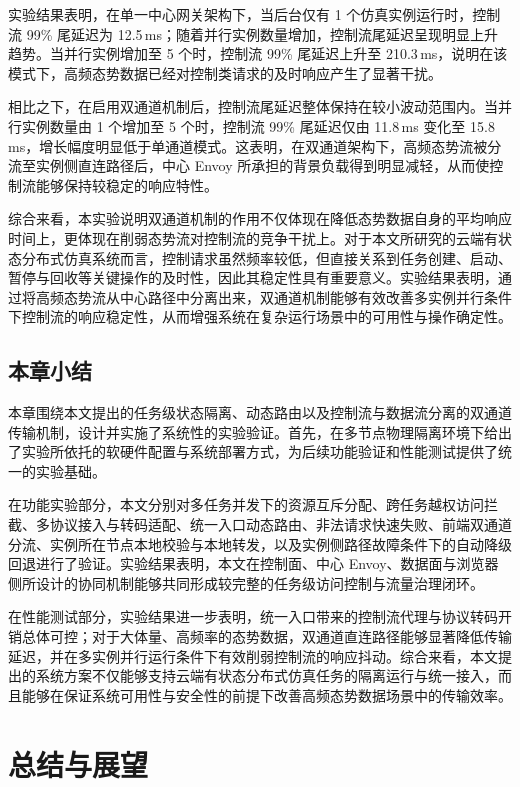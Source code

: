 \documentclass[lang=chs, degree=master, blindreview=true, winfonts=true, academic=false]{yanputhesis}
\begin{document}
实验结果表明，在单一中心网关架构下，当后台仅有 1 个仿真实例运行时，控制流 99\% 尾延迟为 12.5\,ms；随着并行实例数量增加，控制流尾延迟呈现明显上升趋势。当并行实例增加至 5 个时，控制流 99\% 尾延迟上升至 210.3\,ms，说明在该模式下，高频态势数据已经对控制类请求的及时响应产生了显著干扰。

相比之下，在启用双通道机制后，控制流尾延迟整体保持在较小波动范围内。当并行实例数量由 1 个增加至 5 个时，控制流 99\% 尾延迟仅由 11.8\,ms 变化至 15.8\,ms，增长幅度明显低于单通道模式。这表明，在双通道架构下，高频态势流被分流至实例侧直连路径后，中心 Envoy 所承担的背景负载得到明显减轻，从而使控制流能够保持较稳定的响应特性。

综合来看，本实验说明双通道机制的作用不仅体现在降低态势数据自身的平均响应时间上，更体现在削弱态势流对控制流的竞争干扰上。对于本文所研究的云端有状态分布式仿真系统而言，控制请求虽然频率较低，但直接关系到任务创建、启动、暂停与回收等关键操作的及时性，因此其稳定性具有重要意义。实验结果表明，通过将高频态势流从中心路径中分离出来，双通道机制能够有效改善多实例并行条件下控制流的响应稳定性，从而增强系统在复杂运行场景中的可用性与操作确定性。


\section{本章小结}

本章围绕本文提出的任务级状态隔离、动态路由以及控制流与数据流分离的双通道传输机制，设计并实施了系统性的实验验证。首先，在多节点物理隔离环境下给出了实验所依托的软硬件配置与系统部署方式，为后续功能验证和性能测试提供了统一的实验基础。

在功能实验部分，本文分别对多任务并发下的资源互斥分配、跨任务越权访问拦截、多协议接入与转码适配、统一入口动态路由、非法请求快速失败、前端双通道分流、实例所在节点本地校验与本地转发，以及实例侧路径故障条件下的自动降级回退进行了验证。实验结果表明，本文在控制面、中心 Envoy、数据面与浏览器侧所设计的协同机制能够共同形成较完整的任务级访问控制与流量治理闭环。

在性能测试部分，实验结果进一步表明，统一入口带来的控制流代理与协议转码开销总体可控；对于大体量、高频率的态势数据，双通道直连路径能够显著降低传输延迟，并在多实例并行运行条件下有效削弱控制流的响应抖动。综合来看，本文提出的系统方案不仅能够支持云端有状态分布式仿真任务的隔离运行与统一接入，而且能够在保证系统可用性与安全性的前提下改善高频态势数据场景中的传输效率。

\cleardoublepage

\chapter{总结与展望}
\end{document}
